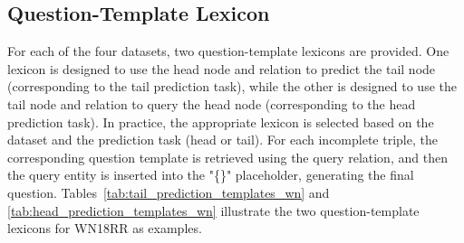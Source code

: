 \documentclass[11pt]{article}
\begin{document}
\subsection{Question-Template Lexicon}\label{app:template_lexicon}
For each of the four datasets, two question-template lexicons are provided. One lexicon is designed to use the head node and relation to predict the tail node (corresponding to the tail prediction task), while the other is designed to use the tail node and relation to query the head node (corresponding to the head prediction task). In practice, the appropriate lexicon is selected based on the dataset and the prediction task (head or tail). For each incomplete triple, the corresponding question template is retrieved using the query relation, and then the query entity is inserted into the "\{\}" placeholder, generating the final question. Tables~\ref{tab:tail_prediction_templates_wn} and \ref{tab:head_prediction_templates_wn} illustrate the two question-template lexicons for WN18RR as examples.
\end{document}
